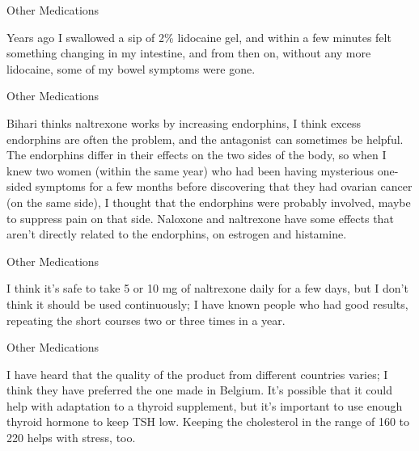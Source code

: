 \documentclass[11pt,oneside,openany,extrafontsizes]{memoir}
\begin{document}
\begin{standalonequote}{Other Medications}

    \begin{answer}
        Years ago I swallowed a sip of 2\% lidocaine gel, and within a few minutes felt something changing in my intestine, and from then on, without any more lidocaine, some of my bowel symptoms were gone.
    \end{answer}
\end{standalonequote}

\begin{standalonequote}{Other Medications}

    \begin{answer}
        Bihari thinks naltrexone works by increasing endorphins, I think excess endorphins are often the problem, and the antagonist can sometimes be helpful. The endorphins differ in their effects on the two sides of the body, so when I knew two women (within the same year) who had been having mysterious one-sided symptoms for a few months before discovering that they had ovarian cancer (on the same side), I thought that the endorphins were probably involved, maybe to suppress pain on that side. Naloxone and naltrexone have some effects that aren't directly related to the endorphins, on estrogen and histamine.
    \end{answer}
\end{standalonequote}

\begin{standalonequote}{Other Medications}

    \begin{answer}
        I think it's safe to take 5 or 10 mg of naltrexone daily for a few days, but I don't think it should be used continuously; I have known people who had good results, repeating the short courses two or three times in a year.
    \end{answer}
\end{standalonequote}

\begin{standalonequote}{Other Medications}

    \begin{answer}
        I have heard that the quality of the product from different countries varies; I think they have preferred the one made in Belgium. It's possible that it could help with adaptation to a thyroid supplement, but it's important to use enough thyroid hormone to keep TSH low. Keeping the cholesterol in the range of 160 to 220 helps with stress, too.
    \end{answer}
\end{standalonequote}
\end{document}
